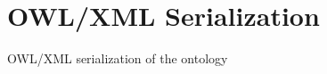 \chapter*{\magoontologyname OWL/XML Serialization}\label{ch: serialization owl}

\begin{longlisting}
    \caption{OWL/XML serialization of the \magoontologyname ontology}
    \label{lst: mago-ag serialization owl}
\end{longlisting}